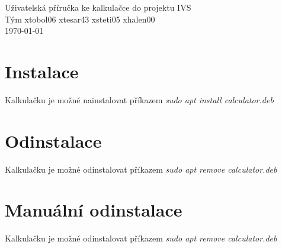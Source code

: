 \documentclass[a4paper, 11pt]{article}
\begin{document}
    \begin{center}
        \LARGE Uživatelská příručka ke kalkulačce do projektu IVS\\[0.4em]

        \Large Tým xtobol06 xtesar43 xsteti05 xhalen00\\[0.4em]

        \Large \today
    \end{center}

    \tableofcontents
    \newpage

    \section{Instalace}
    Kalkulačku je možné nainstalovat příkazem \em{sudo apt install calculator.deb}
	\section{Odinstalace}
    Kalkulačku je možné odinstalovat příkazem \em{sudo apt remove calculator.deb}
	\section{Manuální odinstalace}
    Kalkulačku je možné odinstalovat příkazem \em{sudo apt remove calculator.deb}
\end{document}
